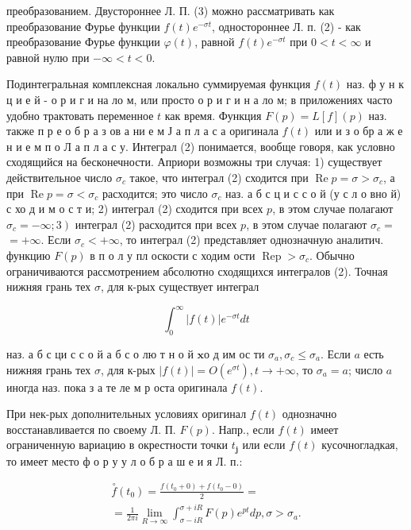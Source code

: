 \documentclass[10pt]{article}
\begin{document}
преобразованием. Двустороннее Л. П. (3) можно рассматривать как преобразование Фурье функции $f(t) e^{-\sigma t}$, одностороннее Л. п. (2) - как преобразование Фурье функции $\varphi(t)$, равной $f(t) e^{-\sigma t}$ при $0<t<\infty$ и равной нулю при $-\infty<t<0$.



Подинтегральная комплексная локально суммируемая функция $f(t)$ наз. ф у н к ц и е й - о р и г и на ло м, или просто о р и г и н а ло м; в приложениях часто удобно трактовать переменное $t$ как время. Функция $F(p)=L[f](p)$ наз. также п р е о б р а з ов а ни е м Ј а п л а с а оригинала $f(t)$ или и з о бр а ж е н и е м п о Л а п л а с у. Интеграл (2) понимается, вообще говоря, как условно сходящийся на бесконечности. Априори возможны три случая: 1) существует действительное число $\sigma_{c}$ такое, что интеграл (2) сходится при $\operatorname{Re} p=\sigma>\sigma_{c}$, а при $\operatorname{Re} p=\sigma<\sigma_{c}$ расходится; это число $\sigma_{c}$ наз. а б с ц и с с о й (у с л о вно й) с хо д и м о с т и; 2) интеграл (2) сходится при всех $p$, в этом случае полагают $\left.\sigma_{c}=-\infty ; 3\right)$ интеграл (2) расходится при всех $p$, в этом случае полагают $\sigma_{c}=$ $=+\infty$. Если $\sigma_{c}<+\infty$, то интеграл (2) представляет однозначную аналитич. функцию $F(p)$ в п о л у пл оскости с ходим ости $\operatorname{Rep}>\sigma_{c}$. Обычно ограничиваются рассмотрением абсолютно сходящихся интегралов (2). Точная нижняя грань тех $\sigma$, для к-рых существует интеграл



\[

\int_{0}^{\infty}|f(t)| e^{-\sigma t} d t

\]



наз. а б с ци с с о й а б с о лю т н о й $\mathbf{x} о$ д им ос ти $\sigma_{a}, \sigma_{c} \leqslant \sigma_{a}$. Если $a$ есть нижняя грань тех $\sigma$, для к-рых $|f(t)|=O\left(e^{\sigma t}\right), t \rightarrow+\infty$, то $\sigma_{a}=a$; число $a$ иногда наз. пока з а те ле м р оста оригинала $f(t)$.



При нек-рых дополнительных условиях оригинал $f(t)$ однозначно восстанавливается по своему Л. П. $F(p)$. Напр., если $f(t)$ имеет ограниченную вариацию в окрестности точки $t_{\mathbf{j}}$ или если $f(t)$ кусочногладкая, то имеет место ф о р у у л о б р а ш е и я Л. п.:



\[

\begin{gathered}

\stackrel{\circ}{f}\left(t_{0}\right)=\frac{f\left(t_{0}+0\right)+f\left(t_{0}-0\right)}{2}= \\

=\frac{1}{2 \pi i} \lim _{R \rightarrow \infty} \int_{\sigma-i R}^{\sigma+i R} F(p) e^{p t} d p, \sigma>\sigma_{a} .

\end{gathered}

\]
\end{document}
